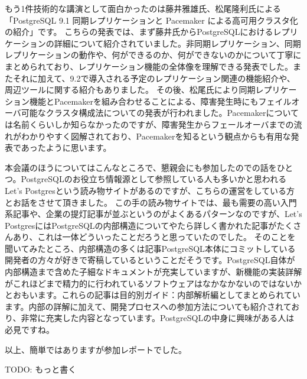 もう1件技術的な講演として面白かったのは藤井雅雄氏、松尾隆利氏による「PostgreSQL 9.1 同期レプリケーションと Pacemaker による高可用クラスタ化の紹介」です。 こちらの発表では、まず藤井氏からPostgreSQLにおけるレプリケーションの詳細について紹介されていました。非同期レプリケーション、同期レプリケーションの動作や、何ができるのか、何ができないのかについて丁寧にまとめられており、レプリケーション機能の全体像を理解できる発表でした。またそれに加えて、9.2で導入される予定のレプリケーション関連の機能紹介や、周辺ツールに関する紹介もありました。 その後、松尾氏により同期レプリケーション機能とPacemakerを組み合わせることによる、障害発生時にもフェイルオーバ可能なクラスタ構成法についての発表が行われました。Pacemakerについては名前くらいしか知らなかったのですが、障害発生からフェールオーバまでの流れがわかりやすく図解されており、Pacemakerを知るという観点からも有用な発表であったように思います。

本会議のほうについてはこんなところで、懇親会にも参加したのでの話をひとつ。PostgreSQLのお役立ち情報源として参照している人も多いかと思われるLet’s Postgresという読み物サイトがあるのですが、こちらの運営をしている方とお話をさせて頂きました。 この手の読み物サイトでは、最も需要の高い入門系記事や、企業の提灯記事が並ぶというのがよくあるパターンなのですが、Let’s PostgresにはPostgreSQLの内部構造についてやたら詳しく書かれた記事がたくさんあり、これは一体どういったことだろうと思っていたのでした。 そのことを聞いてみたところ、内部構造の多くは記事PostgreSQL本体にコミットしている開発者の方々が好きで寄稿しているということだそうです。PostgreSQL自体が内部構造まで含めた子細なドキュメントが充実していますが、新機能の実装詳解がこれほどまで精力的に行われているソフトウェアはなかなかないのではないかとおもいます。これらの記事は目的別ガイド：内部解析編としてまとめられています。内部の詳解に加えて、開発プロセスへの参加方法についても紹介されており、非常に充実した内容となっています。PostgreSQLの中身に興味がある人は必見ですね。

以上、簡単ではありますが参加レポートでした。

TODO: もっと書く
